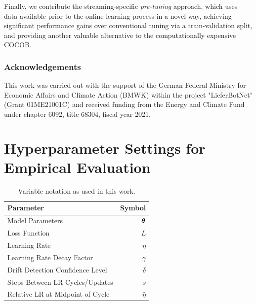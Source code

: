 \documentclass{article} %
\begin{document}
Finally, we contribute the streaming-specific \textit{pre-tuning} approach, which uses data available prior to the online learning process in a novel way, achieving significant performance gains over conventional tuning via a train-validation split, and providing another valuable alternative to the computationally expensive COCOB.

\subsubsection*{Acknowledgements}

This work was carried out with the support of the German Federal Ministry for Economic Affairs and Climate Action (BMWK) within the project "LieferBotNet" (Grant 01ME21001C) and received funding from the Energy and Climate Fund under chapter 6092, title 68304, fiscal year 2021.




\newpage
\appendix
\section{Hyperparameter Settings for Empirical Evaluation}\label{app:hyperparams}

\begin{table}[h]
   \centering
   \caption{Variable notation as used in this work.}
   \begin{tabular}{lr}
      \toprule
      Parameter                        & Symbol       \\
      \midrule
      Model Parameters                 & ${\bm{\theta}} $   \\
      Loss Function                    & $L$          \\
      Learning Rate                    & $\eta$       \\
      Learning Rate Decay Factor       & $\gamma$     \\
      Drift Detection Confidence Level & $\delta$     \\
      Steps Between LR Cycles/Updates  & $s$          \\
      Relative LR at Midpoint of Cycle & $\hat{\eta}$ \\
      \bottomrule
   \end{tabular}
\end{table}
\end{document}
